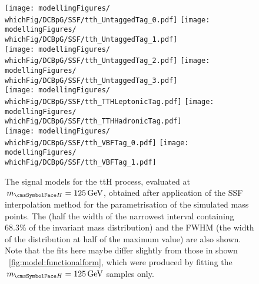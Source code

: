 \begin{figure}[htp!]
\centering
\texttt{[image: modellingFigures/\\whichFig/DCBpG/SSF/tth\_UntaggedTag\_0.pdf]} 
\texttt{[image: modellingFigures/\\whichFig/DCBpG/SSF/tth\_UntaggedTag\_1.pdf]} \\
\texttt{[image: modellingFigures/\\whichFig/DCBpG/SSF/tth\_UntaggedTag\_2.pdf]} 
\texttt{[image: modellingFigures/\\whichFig/DCBpG/SSF/tth\_UntaggedTag\_3.pdf]} \\ 
\texttt{[image: modellingFigures/\\whichFig/DCBpG/SSF/tth\_TTHLeptonicTag.pdf]} 
\texttt{[image: modellingFigures/\\whichFig/DCBpG/SSF/tth\_TTHHadronicTag.pdf]} \\ 
\texttt{[image: modellingFigures/\\whichFig/DCBpG/SSF/tth\_VBFTag\_0.pdf]} 
\texttt{[image: modellingFigures/\\whichFig/DCBpG/SSF/tth\_VBFTag\_1.pdf]} \\

\caption{The signal models for the ttH process, evaluated at $\mH=125\GeV$, obtained after application of the SSF interpolation method for the \DCBpG parametrisation of the simulated mass points. The \effSigma (half the width of the narrowest interval containing 68.3\% of the invariant mass distribution) and the FWHM (the width of the distribution at half of the maximum value) are also shown. Note that the fits here maybe differ slightly from those in shown \Fig~\ref{fig:model:functionalform}, which were produced by fitting the $\mH=125\GeV$ samples only.}

\label{fig:model:sig_model_per_tth}
\end{figure}


